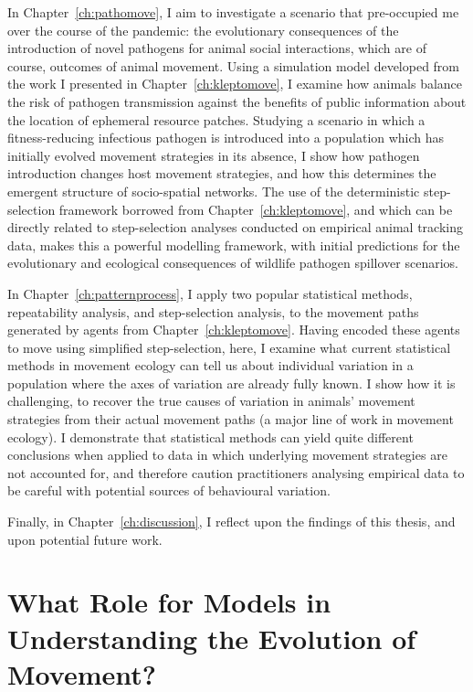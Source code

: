 In Chapter~\ref{ch:pathomove}, I aim to investigate a scenario that pre-occupied me over the course of the pandemic: the evolutionary consequences of the introduction of novel pathogens for animal social interactions, which are of course, outcomes of animal movement.
Using a simulation model developed from the work I presented in Chapter~\ref{ch:kleptomove}, I examine how animals balance the risk of pathogen transmission against the benefits of public information about the location of ephemeral resource patches.
Studying a scenario in which a fitness-reducing infectious pathogen is introduced into a population which has initially evolved movement strategies in its absence, I show how pathogen introduction changes host movement strategies, and how this determines the emergent structure of socio-spatial networks.
The use of the deterministic step-selection framework borrowed from Chapter~\ref{ch:kleptomove}, and which can be directly related to step-selection analyses conducted on empirical animal tracking data, makes this a powerful modelling framework, with initial predictions for the evolutionary and ecological consequences of wildlife pathogen spillover scenarios.

In Chapter~\ref{ch:patternprocess}, I apply two popular statistical methods, repeatability analysis, and step-selection analysis, to the movement paths generated by agents from Chapter~\ref{ch:kleptomove}.
Having encoded these agents to move using simplified step-selection, here, I examine what current statistical methods in movement ecology can tell us about individual variation in a population where the axes of variation are already fully known.
I show how it is challenging, to recover the true causes of variation in animals' movement strategies from their actual movement paths (a major line of work in movement ecology).
I demonstrate that statistical methods can yield quite different conclusions when applied to data in which underlying movement strategies are not accounted for, and therefore caution practitioners analysing empirical data to be careful with potential sources of behavioural variation.

Finally, in Chapter~\ref{ch:discussion}, I reflect upon the findings of this thesis, and upon potential future work.

\section*{What Role for Models in Understanding the Evolution of Movement?}

